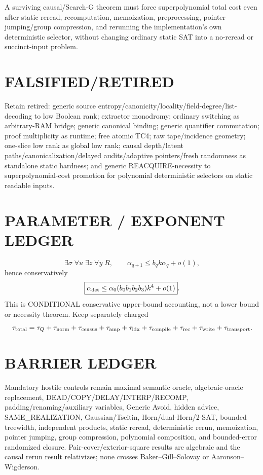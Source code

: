 \documentclass[11pt]{article}
\begin{document}
A surviving causal/Search-G theorem must force superpolynomial total cost even after static reread, recomputation, memoization, preprocessing, pointer jumping/group compression, and rerunning the implementation's own deterministic selector, without changing ordinary static SAT into a no-reread or succinct-input problem.

\section*{FALSIFIED/RETIRED}
Retain retired: generic source entropy/canonicity/locality/field-degree/list-decoding to low Boolean rank; extractor monodromy; ordinary switching as arbitrary-RAM bridge; generic canonical binding; generic quantifier commutation; proof multiplicity as runtime; free atomic TC4; raw tape/incidence geometry; one-slice low rank as global low rank; causal depth/latent paths/canonicalization/delayed audits/adaptive pointers/fresh randomness as standalone static hardness; and generic REACQUIRE-necessity to superpolynomial-cost promotion for polynomial deterministic selectors on static readable inputs.

\section*{PARAMETER / EXPONENT LEDGER}
\[
\boxed{\exists\sigma\;\forall u\;\exists z\;\forall y\;R},\qquad
\alpha_{q+1}\le b_qk\alpha_q+o(1),
\]
hence conservatively
\[
\boxed{\alpha_{\rm det}\le\alpha_0(b_0b_1b_2b_3)k^4+o(1)}.
\]
This is CONDITIONAL conservative upper-bound accounting, not a lower bound or necessity theorem. Keep separately charged
\[
\tau_{\rm total}=\tau_Q+\tau_{\rm norm}+\tau_{\rm census}+\tau_{\rm amp}
+\tau_{\rm idx}+\tau_{\rm compile}+\tau_{\rm rec}+\tau_{\rm write}+\tau_{\rm transport}.
\]

\section*{BARRIER LEDGER}
Mandatory hostile controls remain maximal semantic oracle, algebraic-oracle replacement, DEAD/COPY/DELAY/INTERP/RECOMP, padding/renaming/auxiliary variables, Generic Avoid, hidden advice, SAME\_REALIZATION, Gaussian/Tseitin, Horn/dual-Horn/2-SAT, bounded treewidth, independent products, static reread, deterministic rerun, memoization, pointer jumping, group compression, polynomial composition, and bounded-error randomized closure. Pair-cover/exterior-square results are algebraic and the causal rerun result relativizes; none crosses Baker--Gill--Solovay or Aaronson--Wigderson.
\end{document}

